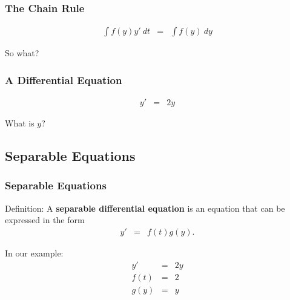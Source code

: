 \begin{frame}
  \frametitle{The Chain Rule}
  \begin{eqnarray*}
    \int f(y) y' ~ dt & = & \int f(y) ~ dy
  \end{eqnarray*}

  So what?

\end{frame}


\begin{frame}
  \frametitle{A Differential Equation}
  
  \begin{eqnarray*}
    y' & = & 2y
  \end{eqnarray*}

  What is $y$?


\end{frame}

\subsection{Separable Equations}

\begin{frame}
  \frametitle{Separable Equations}

  Definition: A \textbf{separable differential equation} is an
  equation that can be expressed in the form 
  \begin{eqnarray*}
    y' & = & f(t) g(y).
  \end{eqnarray*}

  In our example:
  \begin{eqnarray*}
    y' & = & 2y \\
    f(t) & = & 2 \\
    g(y) & = & y
  \end{eqnarray*}

\end{frame}


